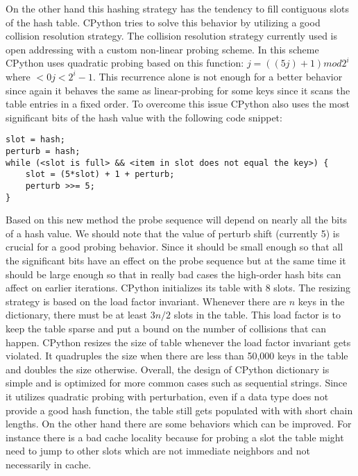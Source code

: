\documentclass[11pt]{article}
\begin{document}
On the other hand this hashing strategy has the tendency to fill contiguous slots of the
hash table. CPython tries to solve this behavior by utilizing a good collision resolution strategy. The collision resolution strategy currently used is open addressing with a custom non-linear probing scheme. In this scheme CPython uses quadratic probing based on this function: $j = ((5j) + 1) mod 2^i$ where $<0j<2^i-1$. This recurrence alone is not enough for a better behavior since again it behaves the same as linear-probing for some keys since it scans the table entries in a fixed order. To overcome this issue CPython also uses the most significant bits of the hash value with the following code snippet:
\begin{verbatim}
slot = hash;
perturb = hash;
while (<slot is full> && <item in slot does not equal the key>) {
    slot = (5*slot) + 1 + perturb;
    perturb >>= 5;
}
\end{verbatim}
Based on this new method the probe sequence will depend on nearly all the bits of a hash value. We should note that the value of  perturb shift (currently 5) is crucial for a good probing behavior. Since it should be small enough so that  all the significant bits have an  effect on the probe sequence but at the same time it should be large enough so that in really bad cases the high-order hash bits can affect on earlier iterations.
CPython initializes its table with 8 slots. The resizing strategy is based on the load factor invariant. Whenever there are $n$ keys in the dictionary, there must be at least $3n/2$ slots in the table. This load factor is to keep the table sparse and put a bound on the number of collisions that can happen. CPython resizes the size of table whenever the load factor invariant gets violated. It quadruples the size when there are less than 50,000 keys in the table and doubles the size otherwise. 
Overall, the design of CPython dictionary is simple and is optimized for more common cases such as sequential strings. Since it utilizes quadratic probing with perturbation, even if a data type does not provide a good hash function, the table still gets populated with with short chain lengths.  On the other hand there are some behaviors which can be improved. For instance there is a bad cache locality because for probing a slot the table might need to jump to other slots which are not immediate neighbors and not necessarily in cache. 
\end{document}

